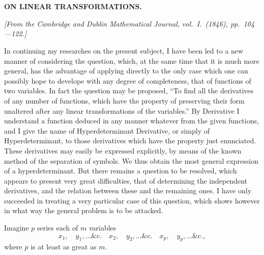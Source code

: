 \documentclass[11pt,a4paper]{book}
\begin{document}
\newpage
\setcounter{section}{13}


\section{}
\begin{center}
\textbf{ON LINEAR TRANSFORMATIONS.}
\end{center}
\textit{[From the Cambridge and Dublin Mathematical Journal, vol.\ I.\ (1846), pp.\ 104---122.]}

In continuing my researches on the present subject, I have been led to a new
manner of considering the question, which, at the same time that it is much more
general, has the advantage of applying directly to the only case which one can
possibly hope to develope with any degree of completeness, that of functions of two
variables. In fact the question may be proposed, ``To find all the derivatives of any
number of functions, which have the property of preserving their form unaltered after
any linear transformations of the variables.'' By Derivative I understand a function
deduced in any manner whatever from the given functions, and I give the name of
Hyperdeterminant Derivative, or simply of Hyperdeterminant, to those derivatives which
have the property just enunciated. These derivatives may easily be expressed explicitly,
by means of the known method of the separation of symbols. We thus obtain the
most general expression of a hyperdeterminant. But there remains a question to be
resolved, which appears to present very great difficulties, that of determining the
independent derivatives, and the relation between these and the remaining ones. I
have only succeeded in treating a very particular case of this question, which shows
however in what way the general problem is to be attacked.

Imagine $p$ series each of $m$ variables
\[
x_1, \quad y_1, \ldots \&\text{c.} \quad x_2, \quad y_2, \ldots \&\text{c.} \quad x_p, \quad y_p, \ldots \&\text{c.},
\]
where $p$ is at least as great as $m$.
\end{document}

